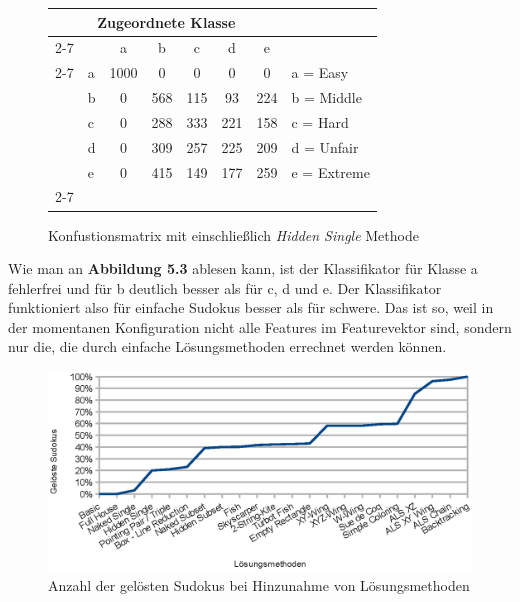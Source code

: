 \begin{figure}[H]
\centering
\begin{tabular}{ l | l |  c  c  c  c  c | l}
\multicolumn{7}{c}{\textbf{Zugeordnete Klasse}}\\
\cline{2-7}
\multirow{6}{*}{\begin{turn}{90}\textbf{Ursprüngliche Klasse}\end{turn}}
 &  & a & b & c & d & e\\
\cline{2-7}
& a & 1000 & 0 & 0 & 0 & 0 & a = Easy \\
& b & 0 & 568 & 115 & 93 & 224 & b = Middle \\
& c & 0 & 288 & 333 & 221 & 158 & c = Hard \\
& d & 0 & 309 & 257 & 225 & 209 & d = Unfair \\
& e & 0 & 415 & 149 & 177 & 259 & e = Extreme \\
\cline{2-7}
\end{tabular}
\caption{Konfustionsmatrix mit einschließlich \textit{Hidden Single} Methode}
\end{figure}

\newpage
\noindent Wie man an \textbf{Abbildung 5.3} ablesen kann, ist der Klassifikator für Klasse a fehlerfrei und für b deutlich besser als für c, d und e. Der Klassifikator funktioniert also für einfache Sudokus besser als für schwere. Das ist so, weil in der momentanen Konfiguration nicht alle Features im Featurevektor sind, sondern nur die, die durch einfache Lösungsmethoden errechnet werden können. 

\begin{figure}[H]
    \includegraphics[width=\textwidth,height=\textheight,keepaspectratio]{./img/solvedcount.eps}
    \caption{Anzahl der gelösten Sudokus bei Hinzunahme von Lösungsmethoden}
\end{figure}

